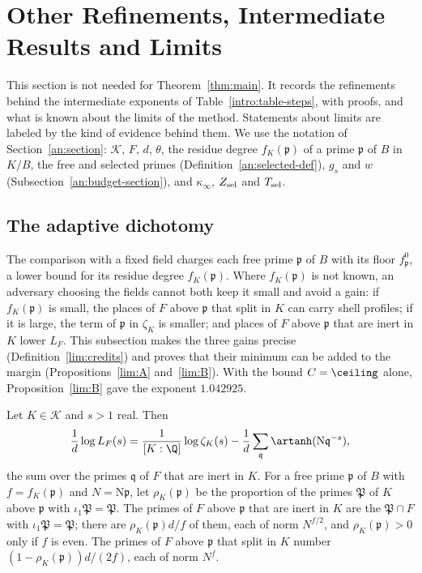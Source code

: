 \section{Other Refinements, Intermediate Results and Limits}\label{lim:section}

This section is not needed for Theorem~\ref{thm:main}. It records the
refinements behind the intermediate exponents of
Table~\ref{intro:table-steps}, with proofs, and what is known about the limits
of the method. Statements about limits are labeled by the kind of evidence
behind them. We use the notation of Section~\ref{an:section}: $\mathcal K$,
$F$, $d$, $\theta$, the residue degree $f_K(\mathfrak p)$ of a prime
$\mathfrak p$ of $B$ in $K/B$, the free and selected primes
(Definition~\ref{an:selected-def}), $g_s$ and $w$
(Subsection~\ref{an:budget-section}), and $\kappa_\infty$, $Z_{\rm sel}$ and
$T_{\rm sel}$.

\subsection{The adaptive dichotomy}
The comparison with a fixed field charges each free prime $\mathfrak p$ of $B$
with its floor $f^0_{\mathfrak p}$, a lower bound for its residue degree
$f_K(\mathfrak p)$. Where $f_K(\mathfrak p)$ is not known, an adversary
choosing the fields cannot both keep it small and avoid a gain: if
$f_K(\mathfrak p)$ is small, the places of $F$ above $\mathfrak p$ that split
in $K$ can carry shell profiles; if it is large, the term of $\mathfrak p$ in
$\zeta_K$ is smaller; and places of $F$ above $\mathfrak p$ that are inert in
$K$ lower $L_F$. This subsection makes the three gains precise
(Definition~\ref{lim:credits}) and proves that their minimum can be added to
the margin (Propositions~\ref{lim:A} and~\ref{lim:B}). With the bound
$C=\ceiling$ alone, Proposition~\ref{lim:B} gave the exponent $1.042925$.

\begin{lemma}\label{lim:inert}
Let $K\in\mathcal K$ and $s>1$ real. Then
\[
 \frac1d\log L_F(s)=\frac1{[K:\Q]}\log\zeta_K(s)-\frac1d\sum_{\mathfrak q}
 \artanh(\mathrm N\mathfrak q^{-s}),
\]
the sum over the primes $\mathfrak q$ of $F$ that are inert in $K$. For a free
prime $\mathfrak p$ of $B$ with $f=f_K(\mathfrak p)$ and $N=\mathrm N\mathfrak
p$, let $\rho_K(\mathfrak p)$ be the proportion of the primes $\mathfrak P$ of
$K$ above $\mathfrak p$ with $\iota_1\mathfrak P=\mathfrak P$. The primes of
$F$ above $\mathfrak p$ that are inert in $K$ are the $\mathfrak P\cap F$ with
$\iota_1\mathfrak P=\mathfrak P$; there are $\rho_K(\mathfrak p)d/f$ of them,
each of norm $N^{f/2}$, and $\rho_K(\mathfrak p)>0$ only if $f$ is even. The
primes of $F$ above $\mathfrak p$ that split in $K$ number
$(1-\rho_K(\mathfrak p))d/(2f)$, each of norm $N^f$.
\end{lemma}

